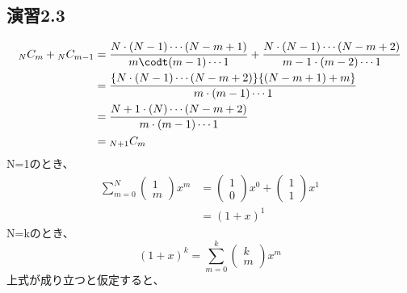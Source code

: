 \documentclass{bxjsarticle}
\begin{document}
\subsection*{演習2.3}
\begin{align*}
{}_N C_m+{}_N C_{m-1} &= \frac{N \cdot (N-1) \cdots (N-m+1)}{m \codt (m-1) \cdots 1} + \frac{N \cdot (N-1) \cdots (N-m+2)}{m-1 \cdot (m-2) \cdots 1} \\
                      &=\frac{\{N \cdot (N-1) \cdots (N-m+2)\}\{(N-m+1)+m\}}{m \cdot (m-1) \cdots 1} \\
                      &=\frac{N+1 \cdot (N) \cdots (N-m+2)}{m \cdot (m-1) \cdots 1} \\
                      &={}_{N+1} C_m
\end{align*}
N=1のとき、
\begin{align*}
\sum_{m=0}^N{\left(\begin{array}{ll} 1 \\ m \end{array} \right)x^m} &= \left(\begin{array}{ll} 1 \\ 0 \end{array} \right)x^0+\left(\begin{array}{ll} 1 \\ 1 \end{array} \right)x^1 \\
        &= (1+x)^1
\end{align*}
N=kのとき、
\[(1+x)^k = \sum_{m=0}^k{\left(\begin{array}{ll} k \\ m \end{array} \right)x^m}\]
上式が成り立つと仮定すると、
\end{document}
